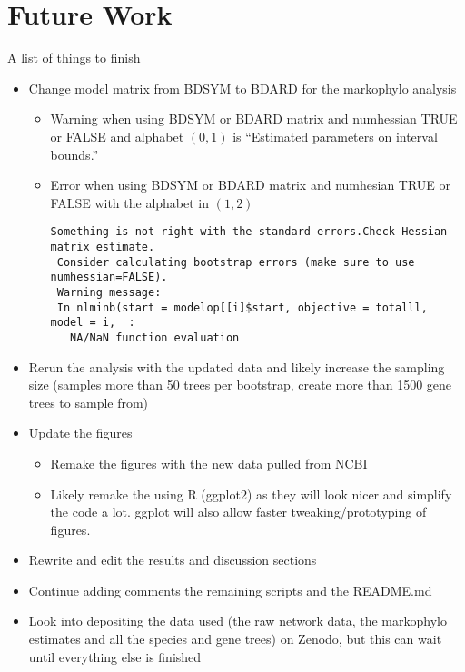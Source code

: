 \documentclass[12pt,letter]{article}
\begin{document}
\section{Future Work}
A list of things to finish
\begin{itemize}
    \item Change model matrix from BDSYM to BDARD for the markophylo analysis
    \begin{itemize}
        \item Warning when using BDSYM or BDARD matrix and numhessian TRUE or FALSE and alphabet $(0,1)$ is ``Estimated parameters on interval bounds.''
        \item Error when using BDSYM or BDARD matrix and numhesian TRUE or FALSE with the alphabet in $(1,2)$
            \begin{lstlisting}[style=rs]
 Something is not right with the standard errors.Check Hessian matrix estimate.
 Consider calculating bootstrap errors (make sure to use numhessian=FALSE).
 Warning message:
 In nlminb(start = modelop[[i]$start, objective = totalll, model = i,  :
   NA/NaN function evaluation
            \end{lstlisting}
    \end{itemize}
    \item Rerun the analysis with the updated data and likely increase the sampling size (samples more than 50 trees per bootstrap, create more than 1500 gene trees to sample from)
    \item Update the figures
    \begin{itemize}
        \item Remake the figures with the new data pulled from NCBI
        \item Likely remake the using R (ggplot2) as they will look nicer and simplify the code a lot. ggplot will also allow faster tweaking/prototyping of figures.
    \end{itemize}
    \item Rewrite and edit the results and discussion sections
    \item Continue adding comments the remaining scripts and the README.md
    \item Look into depositing the data used (the raw network data, the markophylo estimates and all the species and gene trees) on Zenodo, but this can wait until everything else is finished
\end{itemize}
\end{document}
